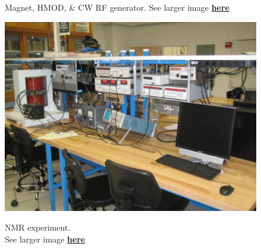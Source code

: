 \documentclass{../lab}
\begin{document}
\begin{figure}[H]
\begin{minipage}{0.32\textwidth}
    \caption{Magnet, HMOD, \& CW RF generator. See larger image \href{http://experimentationlab.berkeley.edu/sites/default/files/images/NMR_Exp_3557.jpg}{\textbf{here}}}
\end{minipage}
\begin{minipage}{0.34\textwidth}
    \href{http://experimentationlab.berkeley.edu/sites/default/files/images/NMR_Exp_3559.jpg}{\includegraphics[width=\linewidth,keepaspectratio]{images/NMR_Exp_3559.jpg}}
    \caption{NMR experiment. \\See larger image \href{http://experimentationlab.berkeley.edu/sites/default/files/images/NMR_Exp_3559.jpg}{\textbf{here}}}
\end{minipage}


\end{figure}
\end{document}
